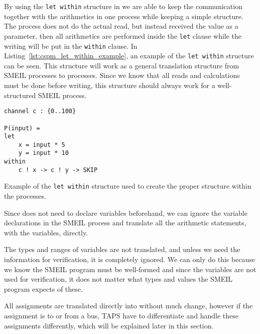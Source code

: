 By using the \texttt{let within} structure in \cspm{} we are able to keep the communication together with the arithmetics in one \cspm{} process while keeping a simple structure. The \cspm{} process does not do the actual read, but instead received the value as a parameter, then all arithmetics are performed inside the \texttt{let} clause while the writing will be put in the \texttt{within} clause.
In Listing~\ref{lst:cspm_let_within_example}, an example of the \texttt{let within} structure can be seen. This structure will work as a general translation structure from SMEIL processes to \cspm{} processes. Since we know that all reads and calculations must be done before writing, this structure should always work for a well-structured SMEIL process.

\begin{listing}
\begin{verbatim}
channel c : {0..100}

P(input) =
let
    x = input * 5
    y = input * 10
within
    c ! x -> c ! y -> SKIP
\end{verbatim}
\caption{Example of the \texttt{let within} structure used to create the proper structure within the \cspm{} processes.}
\label{lst:cspm_let_within_example}
\end{listing}

Since \cspm{} does not need to declare variables beforehand, we can ignore the variable declarations in the SMEIL process and translate all the arithmetic statements, with the variables, directly.


The types and ranges of variables are not translated, and unless we need the information for verification, it is completely ignored. We can only do this because we know the SMEIL program must be well-formed and since the variables are not used for verification, it does not matter what types and values the SMEIL program expects of these.

All assignments are translated directly into \cspm{} without much change, however if the assignment is to or from a bus, TAPS have to differentiate and handle these assignments differently, which will be explained later in this section.

